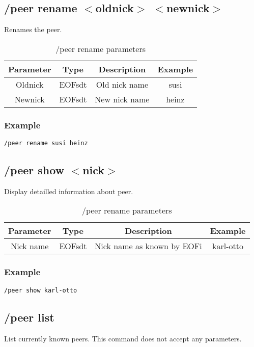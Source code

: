 \documentclass[12pt,a4paper]{book}
\begin{document}
\subsection{/peer rename $<$oldnick$>$ $<$newnick$>$}
Renames the peer.
%
\begin{longtable}{|c|c|c|c|}
\caption{/peer rename parameters}\\
\hline
\textbf{Parameter} & \textbf{Type} & \textbf{Description} & \textbf{Example}\\
\hline
Oldnick & EOFsdt & Old nick name & susi\\
\hline
Newnick & EOFsdt & New nick name & heinz\\
\hline
\end{longtable}

\subsubsection{Example}
\begin{verbatim}
/peer rename susi heinz
\end{verbatim}
\subsection{/peer show $<$nick$>$}
Display detailled information about peer.
%
\begin{longtable}{|c|c|c|c|}
\caption{/peer rename parameters}\\
\hline
\textbf{Parameter} & \textbf{Type} & \textbf{Description} & \textbf{Example}\\
\hline
Nick name & EOFsdt & Nick name as known by EOFi & karl-otto\\
\hline
\end{longtable}

\subsubsection{Example}
\begin{verbatim}
/peer show karl-otto
\end{verbatim}
\subsection{/peer list}
List currently known peers. This command does not accept any parameters.
\end{document}

